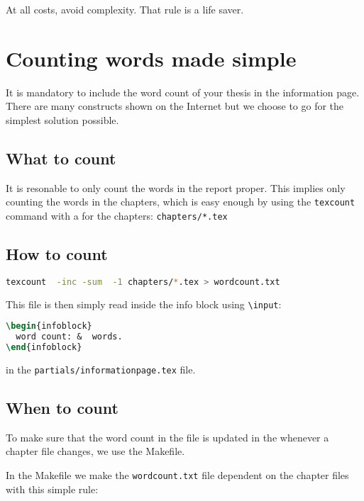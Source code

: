 \begin{savequote}[15cm]
  \vspace{-30mm}
  \sffamily\raggedleft
  At all costs, avoid complexity. That rule is a life saver.
\end{savequote}
\chapter{Counting words made simple}

It is mandatory to include the word count of your thesis in the
information page. There are many constructs shown on the Internet but
we choose to go for the simplest solution possible.

\section{What to count}
It is resonable to only count the words in the report proper.
This implies only counting the words in the chapters, which is easy
enough by using the \texttt{texcount} command with a  for the
chapters: \texttt{chapters/*.tex}

\section{How to count}
\begin{lstlisting}[language=sh]
texcount  -inc -sum  -1 chapters/*.tex > wordcount.txt
\end{lstlisting}

This file is then simply read inside the info block using \texttt{\textbackslash{}input}:
\begin{lstlisting}[language=TeX,emph={wordcount,txt},emphstyle={\colorbox{Yellow}},morekeywords={begin,end}]
\begin{infoblock}
  word count: &  words.
\end{infoblock}
\end{lstlisting}
in the \texttt{partials/informationpage.tex} file.

\section{When to count}
To make sure that the word count in the file is updated in the
whenever a chapter file changes, we use the Makefile.

In the Makefile we make the \texttt{wordcount.txt} file dependent on the
chapter files with this simple rule:

